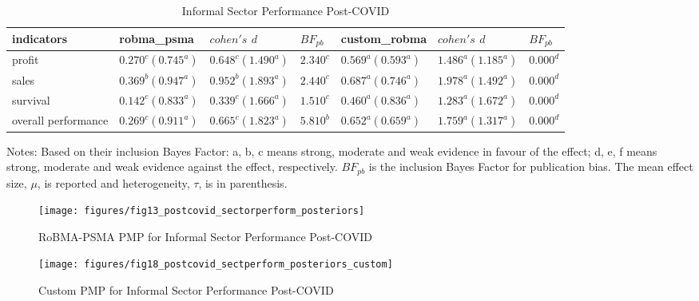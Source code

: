 \documentclass[12pt, english]{article}
\begin{document}
    \begin{table}[H]
        \centering
        \caption{Informal Sector Performance Post-COVID}
        \label{tab6:informal-sector-perform-postcovid}
        \begin{tabular}{lllllll}
            \toprule
            indicators          & robma\_psma         & $cohen's$ $d$       & $BF_{pb}$ & custom\_robma       & $cohen's$ $d$       & $BF_{pb}$ \\
            \midrule
            profit              & $0.270^c (0.745^a)$ & $0.648^c (1.490^a)$ & $2.340^c$ & $0.569^a (0.593^a)$ & $1.486^a (1.185^a)$ & $0.000^d$ \\
            sales               & $0.369^b (0.947^a)$ & $0.952^b (1.893^a)$ & $2.440^c$ & $0.687^a (0.746^a)$ & $1.978^a (1.492^a)$ & $0.000^d$ \\
            survival            & $0.142^c (0.833^a)$ & $0.339^c (1.666^a)$ & $1.510^c$ & $0.460^a (0.836^a)$ & $1.283^a (1.672^a)$ & $0.000^d$ \\
            overall performance & $0.269^c (0.911^a)$ & $0.665^c (1.823^a)$ & $5.810^b$ & $0.652^a (0.659^a)$ & $1.759^a (1.317^a)$ & $0.000^d$ \\
            \bottomrule
        \end{tabular}
        \begin{minipage}{19cm}
            \vspace{0.1cm}
            \small Notes: Based on their inclusion Bayes Factor: a, b, c means strong, moderate and weak evidence in favour of the effect; d, e, f means strong, moderate and weak evidence against the effect, respectively. $BF_{pb}$ is the inclusion Bayes Factor for publication bias. The mean effect size, $\mu$, is reported and heterogeneity, $\tau$, is in parenthesis.
        \end{minipage}
    \end{table}

    \begin{figure}[H]
        \centering
        \texttt{[image: figures/fig13\_postcovid\_sectorperform\_posteriors]}
        \caption{RoBMA-PSMA PMP for Informal Sector Performance Post-COVID}
        \label{fig10:robma-psma-pmp-postcovid-sectorperform-posteriors}
    \end{figure}

    \begin{figure}[H]
        \centering
        \texttt{[image: figures/fig18\_postcovid\_sectperform\_posteriors\_custom]}
        \caption{Custom PMP for Informal Sector Performance Post-COVID}
        \label{fig11:custom-pmp-postcovid-sectorperform-posteriors}
    \end{figure}
\end{document}
